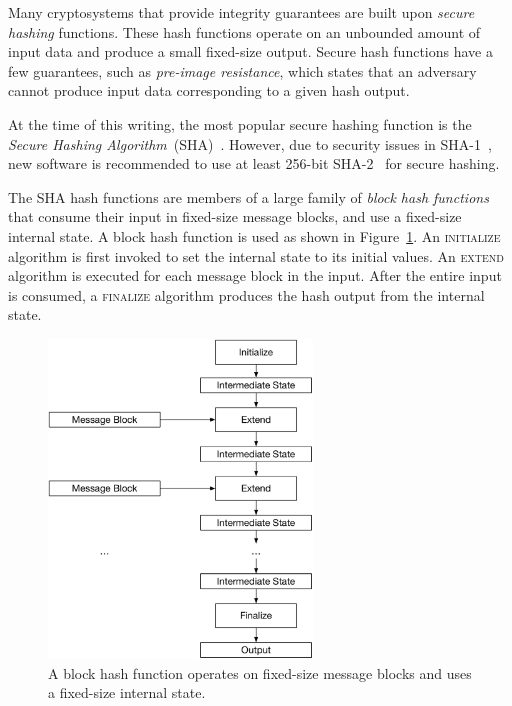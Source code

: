 \label{sec:integrity_crypto}

Many cryptosystems that provide integrity guarantees are built upon
\textit{secure hashing} functions. These hash functions operate on an unbounded
amount of input data and produce a small fixed-size output. Secure hash
functions have a few guarantees, such as \textit{pre-image resistance}, which
states that an adversary cannot produce input data corresponding to a given
hash output.

At the time of this writing, the most popular secure hashing function is the
\textit{Secure Hashing Algorithm}~(SHA)~\cite{eastlake2001sha1}. However, due
to security issues in SHA-1~\cite{stevens2015sha1attack}, new software is
recommended to use at least 256-bit SHA-2~\cite{fips2015shs} for secure
hashing.

The SHA hash functions are members of a large family of \textit{block hash
functions} that consume their input in fixed-size message blocks, and use a
fixed-size internal state. A block hash function is used as shown in
Figure~\ref{fig:block_hash_operation}. An \textsc{initialize} algorithm is
first invoked to set the internal state to its initial values. An
\textsc{extend} algorithm is executed for each message block in the input.
After the entire input is consumed, a \textsc{finalize} algorithm produces the
hash output from the internal state.

\begin{figure}[hbt]
  \centering
  \includegraphics[width=70mm]{figures/block_hash_operation.pdf}
  \caption{
    A block hash function operates on fixed-size message blocks and uses a
    fixed-size internal state.
  }
  \label{fig:block_hash_operation}
\end{figure}

